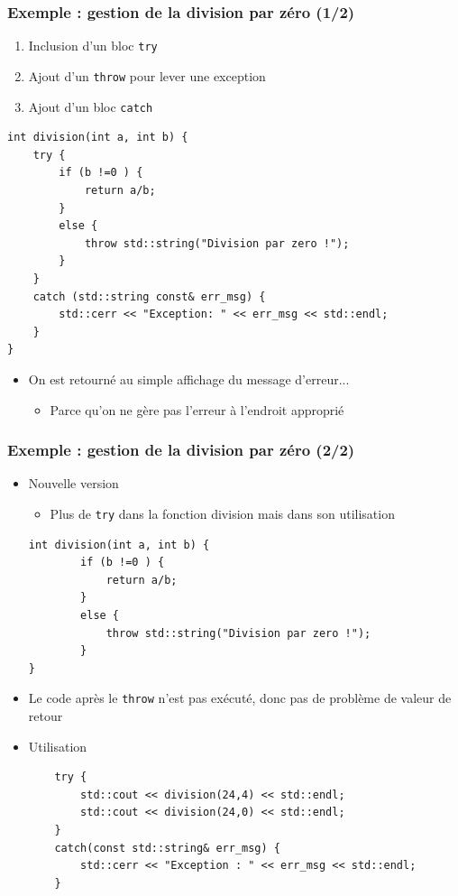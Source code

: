 \begin{frame}[fragile]
\frametitle{Exemple : gestion de la division par zéro (1/2)}
\begin{enumerate}
\item Inclusion d'un bloc \verb|try|
\item Ajout d'un \verb|throw| pour lever une exception
\item Ajout d'un bloc \verb|catch|
\end{enumerate}
\begin{lstlisting}
int division(int a, int b) {
    try {
        if (b !=0 ) {
            return a/b;
        }
        else {
            throw std::string("Division par zero !");
        }
    }
    catch (std::string const& err_msg) {
        std::cerr << "Exception: " << err_msg << std::endl;
    }
}
\end{lstlisting}
\begin{itemize}
\item On est retourné au simple affichage du message d'erreur...
\begin{itemize}
\item Parce qu'on ne gère pas l'erreur à l'endroit approprié
\end{itemize}
\end{itemize}
\end{frame}

\begin{frame}[fragile]
\frametitle{Exemple : gestion de la division par zéro (2/2)}
\begin{itemize}
\item Nouvelle version 
\begin{itemize}
\item Plus de \verb|try| dans la fonction division mais dans son utilisation
\end{itemize}
\begin{lstlisting}
int division(int a, int b) {
        if (b !=0 ) {
            return a/b;
        }
        else {
            throw std::string("Division par zero !");
        }
}
\end{lstlisting}
\item Le code après le \verb|throw| n'est pas exécuté, donc pas de problème de valeur de retour
\item Utilisation
\begin{lstlisting}
    try {
        std::cout << division(24,4) << std::endl;
        std::cout << division(24,0) << std::endl;
    }
    catch(const std::string& err_msg) {
        std::cerr << "Exception : " << err_msg << std::endl;
    }
\end{lstlisting}
\end{itemize}
\end{frame}

